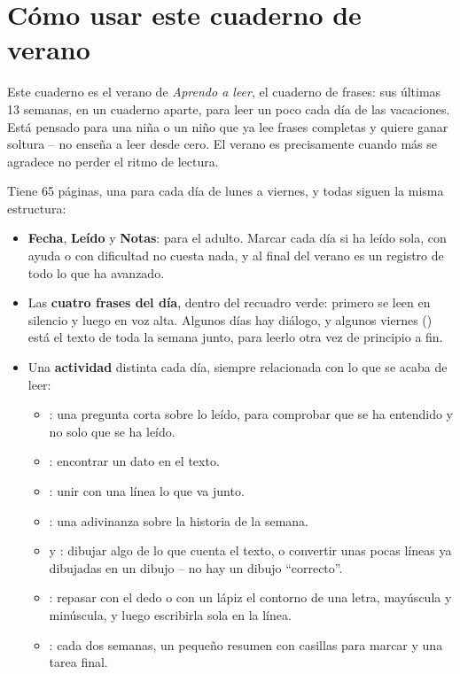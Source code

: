 \section*{Cómo usar este cuaderno de verano}

Este cuaderno es el verano de \emph{Aprendo a leer}, el cuaderno de
frases: sus últimas 13 semanas, en un cuaderno aparte, para leer un poco
cada día de las vacaciones. Está pensado para una niña o un niño que ya
lee frases completas y quiere ganar soltura -- no enseña a leer desde
cero. El verano es precisamente cuando más se agradece no perder el
ritmo de lectura.

Tiene 65 páginas, una para cada día de lunes a viernes, y todas siguen
la misma estructura:

\begin{itemize}[leftmargin=6mm]
\item \textbf{Fecha}, \textbf{Leído} y \textbf{Notas}: para el adulto.
  Marcar cada día si ha leído sola, con ayuda o con dificultad no cuesta
  nada, y al final del verano es un registro de todo lo que ha avanzado.
\item Las \textbf{cuatro frases del día}, dentro del recuadro verde:
  primero se leen en silencio y luego en voz alta. Algunos días hay
  diálogo, y algunos viernes (\textbf{\lblRelee}) está el texto de toda
  la semana junto, para leerlo otra vez de principio a fin.
\item Una \textbf{actividad} distinta cada día, siempre relacionada con
  lo que se acaba de leer:
  \begin{itemize}[leftmargin=6mm]
  \item \textbf{\lblResponde}: una pregunta corta sobre lo leído, para
    comprobar que se ha entendido y no solo que se ha leído.
  \item \textbf{\lblBusca}: encontrar un dato en el texto.
  \item \textbf{\lblRelaciona}: unir con una línea lo que va junto.
  \item \textbf{\lblAdivina}: una adivinanza sobre la historia de la
    semana.
  \item \textbf{\lblDibuja} y \textbf{\lblCompleta}: dibujar algo de lo
    que cuenta el texto, o convertir unas pocas líneas ya dibujadas en
    un dibujo -- no hay un dibujo ``correcto''.
  \item \textbf{\lblTraza}: repasar con el dedo o con un lápiz el
    contorno de una letra, mayúscula y minúscula, y luego escribirla
    sola en la línea.
  \item \textbf{\lblRepasa}: cada dos semanas, un pequeño resumen con
    casillas para marcar y una tarea final.
  \end{itemize}
\end{itemize}

